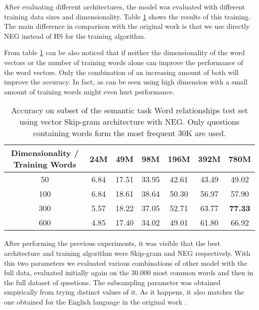 After evaluating different architectures, the  model was evaluated with
different  training data sizes and dimensionality. Table
\ref{tab:initial_w2v_training}  shows the results of this training. The main
difference in comparison with the original work is that we use directly
\ac{NEG}  instead of \ac{HS} for the training algorithm. 


From table \ref{tab:initial_w2v_training} can be also noticed that if 
neither the dimensionality of the word vectors or the number of
training words alone can improve the performance of the word vectors. Only the
combination of an increasing amount of both will improve the accuracy. In
fact, as can be seen using high dimension with a small amount of training
words might even hurt performance.


\begin{table}[h]
\centering
\caption{Accuracy on subset of the semantic task Word relationships test set using
vector Skip-gram architecture with \ac{NEG}. Only questions containing words form the most
 frequent 30K are used. } 
\label{tab:initial_w2v_training}

\small
\begin{tabular}{|c|cccccc|}
\hline
 Dimensionality / Training Words  &   24M  &    49M  &    98M  &   196M  &   392M  &   780M  \\
\hline
                              50  &  6.84  &  17.51  &  33.95  &  42.61  &  43.49  &  49.02  \\
                             100  &  6.84  &  18.61  &  38.64  &  50.30  &  56.97  &  57.90  \\
                             300  &  5.57  &  18.22  &  37.05  &  52.71  &  63.77  & \textbf{77.33}  \\
                             600  &  4.85  &  17.40  &  34.02  &  49.01  &
                             61.80  &  66.92  \\
\hline
\end{tabular}
\end{table}


After performing the previous experiments, it was visible that the best
architecture and training algorithm were Skip-gram and \ac{NEG}
respectively. With this two parameters we evaluated various combinations of
other model with the full data, evaluated initially again on the 30.000 most
common words  and then in the full dataset of questions. The subsampling
parameter was obtained empirically from trying distinct values of it. As it
happens, it also matches the one obtained for the English language in the
original work \cite{DBLP:journals/corr/abs-1301-3781}.

